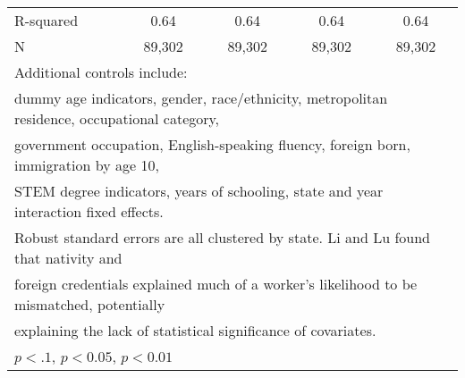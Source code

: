 \begin{table}[htbp]
\begin{tabular}{l*{4}{c}}
R-squared           &        0.64         &        0.64         &        0.64         &        0.64         \\
N                   &      89,302         &      89,302         &      89,302         &      89,302         \\
\bottomrule
\multicolumn{5}{l}{\footnotesize Additional controls include:}\\
\multicolumn{5}{l}{\footnotesize dummy age indicators, gender, race/ethnicity, metropolitan residence, occupational category,}\\
\multicolumn{5}{l}{\footnotesize government occupation, English-speaking fluency, foreign born, immigration by age 10,}\\
\multicolumn{5}{l}{\footnotesize STEM degree indicators, years of schooling, state and year interaction fixed effects.}\\
\multicolumn{5}{l}{\footnotesize Robust standard errors are all clustered by state. Li and Lu found that nativity and}\\
\multicolumn{5}{l}{\footnotesize foreign credentials explained much of a worker's likelihood to be mismatched, potentially}\\
\multicolumn{5}{l}{\footnotesize explaining the lack of statistical significance of covariates.}\\
\multicolumn{5}{l}{\footnotesize \sym{*} \(p<.1\), \sym{**} \(p<0.05\), \sym{***} \(p<0.01\)}\\
\end{tabular}
\end{table}
